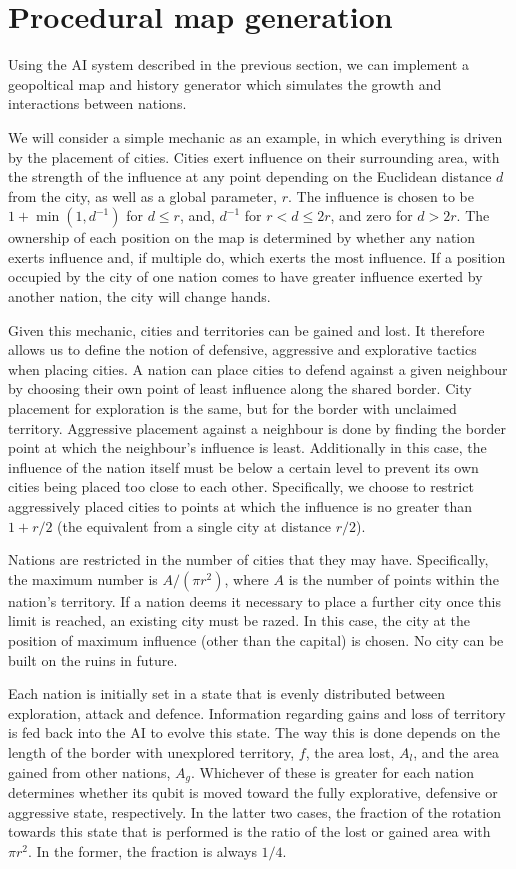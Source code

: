 \documentclass[conference]{IEEEtran}
\begin{document}
\section{Procedural map generation}

Using the AI system described in the previous section, we can implement a geopoltical map and history generator which simulates the growth and interactions between nations.

We will consider a simple mechanic as an example, in which everything is driven by the placement of cities. Cities exert influence on their surrounding area, with the strength of the influence at any point depending on the Euclidean distance $d$ from the city, as well as a global parameter, $r$. The influence is chosen to be $1+\min(1,d^{-1})$ for $d \leq r$, and, $d^{-1}$ for $ r< d \leq 2r$, and zero for $d>2r$. The ownership of each position on the map is determined by whether any nation exerts influence and, if multiple do, which exerts the most influence. If a position occupied by the city of one nation comes to have greater influence exerted by another nation, the city will change hands.

Given this mechanic, cities and territories can be gained and lost. It therefore allows us to define the notion of defensive, aggressive and explorative tactics when placing cities. A nation can place cities to defend against a given neighbour by choosing their own point of least influence along the shared border. City placement for exploration is the same, but for the border with unclaimed territory. Aggressive placement against a neighbour is done by finding the border point at which the neighbour's influence is least. Additionally in this case, the influence of the nation itself must be below a certain level to prevent its own cities being placed too close to each other. Specifically, we choose to restrict aggressively placed cities to points at which the influence is no greater than $1+r/2$ (the equivalent from a single city at distance $r/2$).

Nations are restricted in the number of cities that they may have. Specifically, the maximum number is $A/(\pi r^2)$, where $A$ is the number of points within the nation's territory. If a nation deems it necessary to place a further city once this limit is reached, an existing city must be razed. In this case, the city at the position of maximum influence (other than the capital) is chosen. No city can be built on the ruins in future.

Each nation is initially set in a state that is evenly distributed between exploration, attack and defence. Information regarding gains and loss of territory is fed back into the AI to evolve this state. The way this is done depends on the length of the border with unexplored territory, $f$, the area lost, $A_{l}$, and the area gained from other nations, $A_{g}$. Whichever of these is greater for each nation determines whether its qubit is moved toward the fully explorative, defensive or aggressive state, respectively. In the latter two cases, the fraction of the rotation towards this state that is performed is the ratio of the lost or gained area with $\pi r^2$. In the former, the fraction is always $1/4$. 
\end{document}
